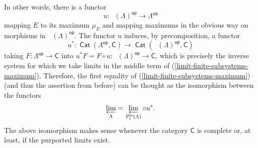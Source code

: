 \documentclass[reqno,11pt]{amsart}
\theoremstyle{plain}
\theoremstyle{remark}
\theoremstyle{definition}
\numberwithin{equation}{thm}
\newcommand{\CP}{\mathcal{P}}
\newcommand{\SC}{\mathsf{C}}
\newcommand{\lto}{\longrightarrow}
\newcommand{\op}{\mathsf{op}}
\DeclareMathOperator{\cat}{\mathsf{Cat}}
\DeclareMathOperator{\pfinmax}{\CP_{\mathsf{f}}^{\mathsf{m}}}
\begin{document}
	In other words, there is a functor
	\[
		u \colon \pfinmax(\Lambda)^\op \lto \Lambda^\op
	\]
	mapping $E$ to its maximum $\mu_E$ and mapping maximums in the obvious way on morphisms in $\pfinmax(\Lambda)^\op$. The functor $u$ induces, by precomposition, a functor
	\[
		u^* \colon \cat(\Lambda^\op, \SC) \lto \cat(\pfinmax(\Lambda)^\op, \SC)
	\] taking $F \colon \Lambda^\op \to \SC$ into $u^* F = F \circ u \colon \pfinmax(\Lambda)^\op \to \SC$, which is precisely the inverse system for which we take limits in the middle term of (\ref{limit-finite-subsystems-maximum}). Therefore, the first equality of (\ref{limit-finite-subsystems-maximum}) (and thus the assertion from before) can be thought as the isomorphism between the functors
	\begin{equation}\label{limit-finite-subsystems-u*}
		\varprojlim_{\Lambda} = \varprojlim_{\pfinmax(\Lambda)} \circ u^*.
	\end{equation}
	The above isomorphism makes sense whenever the category $\SC$ is complete or, at least, if the purported limits exist.
	
\end{document}
